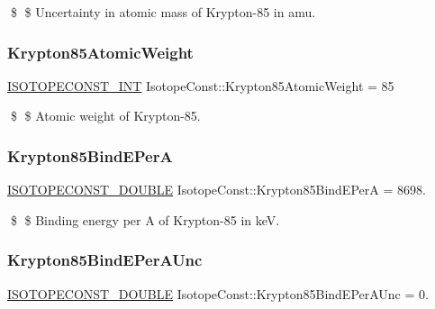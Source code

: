 \$ \$ Uncertainty in atomic mass of Krypton-\/85 in amu. \mbox{\label{group___isotope_const-_krypton-_kr85_gae6663a63560d23a6ca4edb2201bffb1c}} 
\subsubsection{\texorpdfstring{Krypton85\+Atomic\+Weight}{Krypton85AtomicWeight}}
{\footnotesize\ttfamily \mbox{\hyperlink{group___isotope_const-_macros_ga5f18360b3e99483a35c32d789e62621c}{I\+S\+O\+T\+O\+P\+E\+C\+O\+N\+S\+T\+\_\+\+I\+NT}} Isotope\+Const\+::\+Krypton85\+Atomic\+Weight = 85}

\$ \$ Atomic weight of Krypton-\/85. \mbox{\label{group___isotope_const-_krypton-_kr85_ga6679730542fb67356a02a7c850509b86}} 
\subsubsection{\texorpdfstring{Krypton85\+Bind\+E\+PerA}{Krypton85BindEPerA}}
{\footnotesize\ttfamily \mbox{\hyperlink{group___isotope_const-_macros_ga8f45a7272ce02c0b4c65c44636ed719a}{I\+S\+O\+T\+O\+P\+E\+C\+O\+N\+S\+T\+\_\+\+D\+O\+U\+B\+LE}} Isotope\+Const\+::\+Krypton85\+Bind\+E\+PerA = 8698.}

\$ \$ Binding energy per A of Krypton-\/85 in keV. \mbox{\label{group___isotope_const-_krypton-_kr85_gac3555ccc511266c799a1f49c39cdf40f}} 
\subsubsection{\texorpdfstring{Krypton85\+Bind\+E\+Per\+A\+Unc}{Krypton85BindEPerAUnc}}
{\footnotesize\ttfamily \mbox{\hyperlink{group___isotope_const-_macros_ga8f45a7272ce02c0b4c65c44636ed719a}{I\+S\+O\+T\+O\+P\+E\+C\+O\+N\+S\+T\+\_\+\+D\+O\+U\+B\+LE}} Isotope\+Const\+::\+Krypton85\+Bind\+E\+Per\+A\+Unc = 0.}

